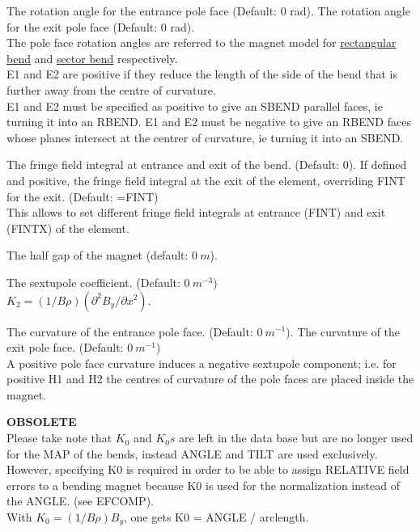 \begin{madlist}
    The rotation angle for the entrance pole face (Default: 0 rad). 
    The rotation angle for the exit pole face (Default: 0 rad). \\
   The pole face rotation angles are referred to the magnet model for
   \href{local_system.html#rbend}{rectangular bend} and
   \href{local_system.html#sbend}{sector bend} respectively. \\
   E1 and E2 are positive if they reduce the length of the
   side of the bend that is further away from the centre of
   curvature. \\
   E1 and E2 must be specified as positive to give an SBEND parallel
   faces, ie turning it into an RBEND. E1 and E2 must be negative to
   give an RBEND faces whose planes intersect at the centrer of
   curvature, ie turning it into an SBEND. 

    The fringe field integral at entrance and exit of the
   bend. (Default:  0). 
    If defined and positive, the fringe field integral at
   the exit of the element, overriding FINT for the exit. (Default: =FINT) \\ 
   This allows to set different fringe field integrals at entrance
   (FINT) and exit (FINTX) of the element.  

    The half gap of the magnet (default: $0\ m$). 

    The sextupole coefficient. (Default: $0\ m^{-3}$) \\ 
   $K_2 = (1/B\rho) (\partial^2 B_y / \partial x^2)$.   

   The curvature of the entrance pole face. 
   (Default: $0\ m^{-1}$).   
    The curvature of the exit pole face. (Default: $0\ m^{-1}$) \\
   A positive pole face curvature induces a negative sextupole
   component; i.e. for positive H1 and H2 the centres of curvature of
   the pole faces are placed inside the magnet. 

    {\bf OBSOLETE} \\
   Please take note that $K_0$ and $K_0s$ are left in the
   data base but are no longer used for the MAP of the bends,
   instead ANGLE and TILT are used exclusively. \\
   However, specifying K0 is required in order to be able to assign RELATIVE 
   field errors to a bending magnet because K0 is used for the normalization 
   instead of the ANGLE. (see EFCOMP).\\
   With $K_0 = (1 / B \rho) B_y$, one gets K0 = ANGLE / arclength.


\end{madlist}
